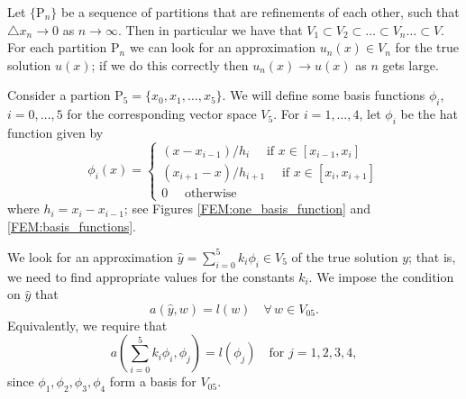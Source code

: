 Let $\{\mathrm{P}_n\}$ be a sequence of partitions that are refinements of each other, such that $\triangle x_n \to 0$ as $n \to \infty$. Then in particular we have that $V_1 \subset V_2 \subset \ldots \subset V_n \ldots \subset V$.  For each partition $\mathrm{P}_n$ we can look for an approximation $u_n(x) \in V_n$ for the true solution $u(x)$; if we do this correctly then $u_n(x) \to u(x)$ as $n$ gets large. 


Consider a partion $\mathrm{P}_5 = \{x_0, x_1, \ldots, x_5\}$. We will define some basis functions $\phi_i$, $i = 0, \ldots, 5$ for the corresponding vector space $V_5$. For $i = 1, \ldots, 4$, let $\phi_i$ be the hat function given by 
\[
\phi_i(x) = \begin{cases}
(x - x_{i-1})/h_i \quad \text{ if } x \in [x_{i-1},x_i]\\
 (x_{i+1} - x)/h_{i+1} \quad \text{ if } x \in [x_{i},x_{i+1}]\\
0 \quad \text{ otherwise}
\end{cases}
\]
where $h_i = x_i - x_{i-1}$; see Figures \ref{FEM:one_basis_function} and \ref{FEM:basis_functions}.

We look for an approximation $\hat{y} = \sum_{i=0}^5 k_i \phi_i \in V_5$ of the true solution $y$; that is, we need to find appropriate values for the constants $k_i$. We impose the condition on $\hat{y}$ that 
\[a(\hat{y},w) = l(w) \quad \forall \, w \in V_{05}.\]
Equivalently, we require that 
\[a \left( \sum_{i=0}^5 k_i \phi_i,\phi_j \right) = l(\phi_j) \quad \text{for } j = 1,2,3,4,\]
since $\phi_1, \phi_2, \phi_3, \phi_4$ form a basis for $V_{05}$.



